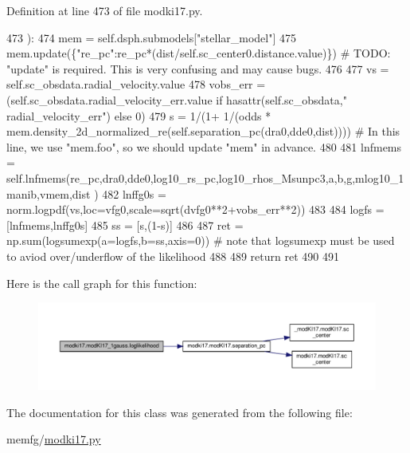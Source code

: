 Definition at line 473 of file modki17.\+py.


\begin{DoxyCode}
473     ):
474         mem = self.dsph.submodels[\textcolor{stringliteral}{"stellar\_model"}]
475         mem.update(\{\textcolor{stringliteral}{"re\_pc"}:re\_pc*(dist/self.sc\_center0.distance.value)\}) \textcolor{comment}{# TODO: "update" is required.
       This is very confusing and may cause bugs.}
476         
477         vs = self.sc\_obsdata.radial\_velocity.value
478         vobs\_err = (self.sc\_obsdata.radial\_velocity\_err.value \textcolor{keywordflow}{if} hasattr(self.sc\_obsdata,\textcolor{stringliteral}{"
      radial\_velocity\_err"}) \textcolor{keywordflow}{else} 0)
479         s = 1/(1+ 1/(odds * mem.density\_2d\_normalized\_re(self.separation\_pc(dra0,dde0,dist)))) \textcolor{comment}{# In this
       line, we use "mem.foo", so we should update "mem" in advance.}
480         
481         lnfmems = self.lnfmems(re\_pc,dra0,dde0,log10\_rs\_pc,log10\_rhos\_Msunpc3,a,b,g,mlog10\_1manib,vmem,dist
      )
482         lnffg0s = norm.logpdf(vs,loc=vfg0,scale=sqrt(dvfg0**2+vobs\_err**2))
483     
484         logfs = [lnfmems,lnffg0s]
485         ss = [s,(1-s)]
486         
487         ret = np.sum(logsumexp(a=logfs,b=ss,axis=0)) \textcolor{comment}{# note that logsumexp must be used to aviod
       over/underflow of the likelihood}
488         
489         \textcolor{keywordflow}{return} ret
490     
491     
\end{DoxyCode}
Here is the call graph for this function\+:\nopagebreak
\begin{figure}[H]
\begin{center}
\leavevmode
\includegraphics[width=350pt]{de/d10/classmodki17_1_1modKI17__1gauss_a33a9f117f11c57c90b8d95661ce9980b_cgraph}
\end{center}
\end{figure}


The documentation for this class was generated from the following file\+:\begin{DoxyCompactItemize}
\item 
memfg/\hyperlink{modki17_8py}{modki17.\+py}\end{DoxyCompactItemize}
